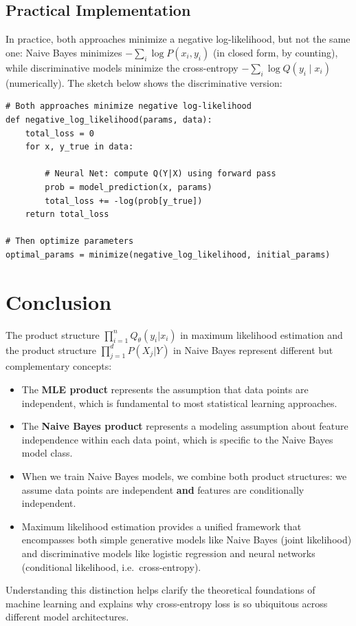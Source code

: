 \begin{notechapter}
\subsection{Practical Implementation}

In practice, both approaches minimize a negative log-likelihood, but not the same one: Naive Bayes minimizes \( -\sum_i \log P(x_i, y_i) \) (in closed form, by counting), while discriminative models minimize the cross-entropy \( -\sum_i \log Q(y_i \mid x_i) \) (numerically). The sketch below shows the discriminative version:

\begin{example}
\begin{verbatim}
# Both approaches minimize negative log-likelihood
def negative_log_likelihood(params, data):
    total_loss = 0
    for x, y_true in data:
        
        # Neural Net: compute Q(Y|X) using forward pass
        prob = model_prediction(x, params)
        total_loss += -log(prob[y_true])
    return total_loss

# Then optimize parameters
optimal_params = minimize(negative_log_likelihood, initial_params)
\end{verbatim}
\end{example}

\section{Conclusion}

The product structure $\prod_{i=1}^n Q_\theta(y_i|x_i)$ in maximum likelihood estimation and the product structure $\prod_{j=1}^d P(X_j|Y)$ in Naive Bayes represent different but complementary concepts:

\begin{itemize}
    \item The \textbf{MLE product} represents the assumption that data points are independent, which is fundamental to most statistical learning approaches.
    
    \item The \textbf{Naive Bayes product} represents a modeling assumption about feature independence within each data point, which is specific to the Naive Bayes model class.
    
    \item When we train Naive Bayes models, we combine both product structures: we assume data points are independent \textbf{and} features are conditionally independent.
    
        \item Maximum likelihood estimation provides a unified framework that encompasses both simple generative models like Naive Bayes (joint likelihood) and discriminative models like logistic regression and neural networks (conditional likelihood, i.e.\ cross-entropy).
\end{itemize}

Understanding this distinction helps clarify the theoretical foundations of machine learning and explains why cross-entropy loss is so ubiquitous across different model architectures.
\end{notechapter}
